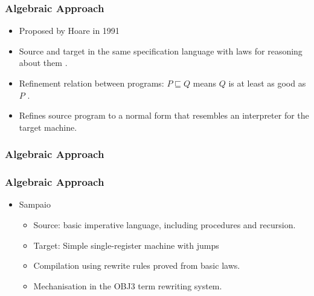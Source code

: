 \documentclass{beamer}
\newcommand{\footmake}[1]{
\ifthenelse{\equal{#1}{}}%
	{}%
	{\footnotetext{#1}}%
}
\newenvironment{slide}[2][fragile,environment=slide]
{\begin{frame}[#1]
	\frametitle{#2}\begin{refsegment}}
{\footmake{\printbibliography[segment=\therefsegment]}\end{refsegment}\end{frame}}
\begin{document}
\begin{slide}{Algebraic Approach}
  \begin{itemize}
  \item Proposed by Hoare in 1991\cite{hoare1991}
  \item Source and target in the same specification language with laws for reasoning about them \cite{hoare1987}.
  \item Refinement relation between programs: $P \sqsubseteq Q$ means $Q$ is at least as good as $P$ \cite{back1981, morris1987, morgan1990}.
  \item Refines source program to a normal form that resembles an interpreter for the target machine.
  \end{itemize}
\end{slide}

\begin{frame}
  \frametitle{Algebraic Approach}
\end{frame}

\begin{slide}{Algebraic Approach}
  \begin{itemize}
  \item Sampaio\cite{hoare1993, sampaio1993, sampaio1997}
    \begin{itemize}
    \item Source: basic imperative language, including procedures and recursion.
    \item Target: Simple single-register machine with jumps
    \item Compilation using rewrite rules proved from basic laws.
    \item Mechanisation in the OBJ3 term rewriting system\cite{goguen1988}.
    \end{itemize}
  \end{itemize}
\end{slide}
\end{document}
